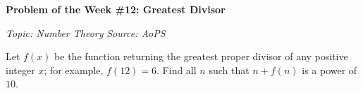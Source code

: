 \begin{potw}\vspace{5pt}
{\large\textbf{Problem of the Week \#12: Greatest Divisor}}\vspace{5pt}

\textit{Topic: Number Theory}\newline
\textit{Source: AoPS}\V

Let $f(x)$ be the function returning the greatest proper divisor of any positive integer $x$; for example, $f(12) = 6$. Find all $n$ such that $n + f(n)$ is a power of $10$.
\end{potw}\V
